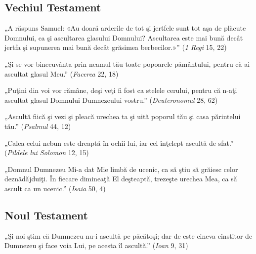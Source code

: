 \subsection{Vechiul Testament}



\begin{displayquote}
    „A răspuns Samuel: «Au doară arderile de tot şi jertfele sunt tot aşa de plăcute Domnului, ca şi ascultarea glasului Domnului? Ascultarea este mai bună decât jertfa şi supunerea mai bună decât grăsimea berbecilor.»”
    (\textit{1 Regi} 15, 22)
\end{displayquote}

\begin{displayquote}
    „Şi se vor binecuvânta prin neamul tău toate popoarele pământului, pentru că ai ascultat glasul Meu.”
    (\textit{Facerea} 22, 18)
\end{displayquote}

\begin{displayquote}
    „Puţini din voi vor rămâne, deşi veţi fi fost ca stelele cerului, pentru că n-aţi ascultat glasul Domnului Dumnezeului vostru.”
    (\textit{Deuteronomul} 28, 62)
\end{displayquote}

\begin{displayquote}
    „Ascultă fiică şi vezi şi pleacă urechea ta şi uită poporul tău şi casa părintelui tău.”
    (\textit{Psalmul} 44, 12)
\end{displayquote}

\begin{displayquote}
    „Calea celui nebun este dreaptă în ochii lui, iar cel înţelept ascultă de sfat.”
    (\textit{Pildele lui Solomon} 12, 15)
\end{displayquote}

\begin{displayquote}
    „Domnul Dumnezeu Mi-a dat Mie limbă de ucenic, ca să ştiu să grăiesc celor deznădăjduiţi. În fiecare dimineaţă El deşteaptă, trezeşte urechea Mea, ca să ascult ca un ucenic.”
    (\textit{Isaia} 50, 4)
\end{displayquote}

\subsection{Noul Testament}

\begin{displayquote}
    „Şi noi ştim că Dumnezeu nu-i ascultă pe păcătoşi; dar de este cineva cinstitor de Dumnezeu şi face voia Lui, pe acesta îl ascultă.”
    (\textit{Ioan} 9, 31)
\end{displayquote}